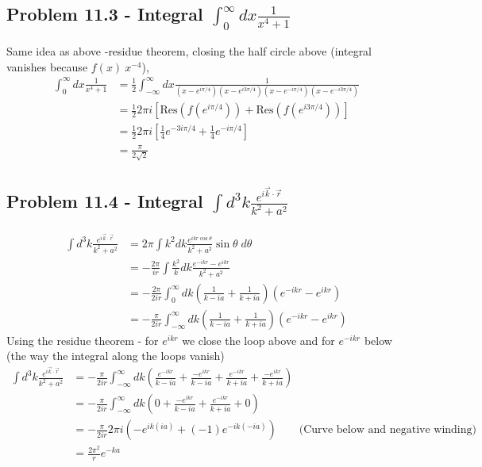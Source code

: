 \documentclass[../main.tex]{subfiles}
\begin{document}
\subsection{Problem 11.3 - Integral $\int_0^\infty dx \frac{1}{x^4+1}$}
Same idea as above -residue theorem, closing the half circle above (integral vanishes because $f(x)~x^{-4}$), 
\begin{align}
\int_0^\infty dx \frac{1}{x^4+1}
&=\frac{1}{2}\int_{-\infty}^\infty dx \frac{1}{(x-e^{i\pi/4})(x-e^{i3\pi/4})(x-e^{-i\pi/4})(x-e^{-i3\pi/4})}\\
&=\frac{1}{2}2\pi i\left[\text{Res}(f(e^{i\pi/4}))+\text{Res}(f(e^{i3\pi/4}))\right]\\
&=\frac{1}{2}2\pi i\left[\frac{1}{4}e^{-3i\pi/4}+\frac{1}{4}e^{-i\pi/4}\right]\\
&=\frac{\pi}{2\sqrt{2}}
\end{align}

\subsection{Problem 11.4 - Integral $\int d^3k \frac{e^{i\vec{k}\cdot\vec{r}}}{k^2+a^2}$}
\begin{align}
\int d^3k \frac{e^{i\vec{k}\cdot\vec{r}}}{k^2+a^2}
&=2\pi\int k^2dk \frac{e^{ikr\cos\theta}}{k^2+a^2}\sin\theta\;d\theta\\
&=-\frac{2\pi}{ir}\int \frac{k^2}{k}dk \frac{e^{-ikr}-e^{ikr}}{k^2+a^2}\\
&=-\frac{2\pi}{2ir}\int_0^\infty dk \left(\frac{1}{k-ia}+\frac{1}{k+ia}\right)\left(e^{-ikr}-e^{ikr}\right)\\
&=-\frac{\pi}{2ir}\int_{-\infty}^\infty dk \left(\frac{1}{k-ia}+\frac{1}{k+ia}\right)\left(e^{-ikr}-e^{ikr}\right)
\end{align}
Using the residue theorem - for $e^{ikr}$ we close the loop above and for $e^{-ikr}$ below (the way the integral along the loops vanish)
\begin{align}
\int d^3k \frac{e^{i\vec{k}\cdot\vec{r}}}{k^2+a^2}
&=-\frac{\pi}{2ir}\int_{-\infty}^\infty dk \left(\frac{e^{-ikr}}{k-ia}+\frac{-e^{ikr}}{k-ia}+\frac{e^{-ikr}}{k+ia}+\frac{-e^{ikr}}{k+ia}\right)\\
&=-\frac{\pi}{2ir}\int_{-\infty}^\infty dk \left(0+\frac{-e^{ikr}}{k-ia}+\frac{e^{-ikr}}{k+ia}+0\right)\\
&=-\frac{\pi}{2ir}2\pi i\left(-e^{ik(ia)}+(-1)e^{-ik(-ia)}\right)\qquad\text{(Curve below and negative winding)}\\
&=\frac{2\pi^2}{r}e^{-ka}
\end{align}
\end{document}
